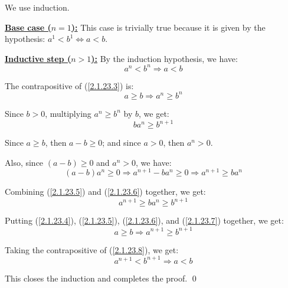 \documentclass{article}
\begin{document}
\noindent
We use induction.
\newline

\noindent
\textbf{\underline{Base case ($n=1$):}} This case is trivially true because it is given by the hypothesis: $a^1<b^1 \iff a < b$.
\newline

\noindent
\textbf{\underline{Inductive step ($n>1$):}} By the induction hypothesis, we have: 
\begin{equation}
  a^n<b^n \Rightarrow a < b \label{2.1.23.3}
\end{equation}

\noindent
The contrapositive of (\ref{2.1.23.3}) is:
\begin{equation}
  a \geq b \Rightarrow a^n \geq b^n \label{2.1.23.4}
\end{equation}

\noindent
Since $b>0$, multiplying $a^n \geq b^n$ by $b$, we get:
\begin{equation}
  ba^n \geq b^{n+1} \label{2.1.23.5}
\end{equation}

\noindent
Since $a \geq b$, then $a-b \geq 0$; and since $a>0$, then $a^n>0$.

\noindent
Also, since $(a-b) \geq 0$ and $a^n>0$, we have: 
\begin{equation}
  (a-b)a^n \geq 0 \Rightarrow a^{n+1} - ba^n \geq 0 \Rightarrow a^{n+1} \geq ba^n \label{2.1.23.6}
\end{equation}

\noindent
Combining (\ref{2.1.23.5}) and (\ref{2.1.23.6}) together, we get:
\begin{equation}
  a^{n+1} \geq ba^n \geq b^{n+1} \label{2.1.23.7}
\end{equation}

\noindent
Putting (\ref{2.1.23.4}), (\ref{2.1.23.5}), (\ref{2.1.23.6}), and (\ref{2.1.23.7}) together, we get:
\begin{equation}
  a \geq b \Rightarrow a^{n+1} \geq b^{n+1}  \label{2.1.23.8}
\end{equation}

\noindent
Taking the contrapositive of (\ref{2.1.23.8}), we get:
\begin{equation}
  a^{n+1} < b^{n+1} \Rightarrow a < b
\end{equation}

\noindent
This closes the induction and completes the proof.
\qed
\newline
\end{document}

